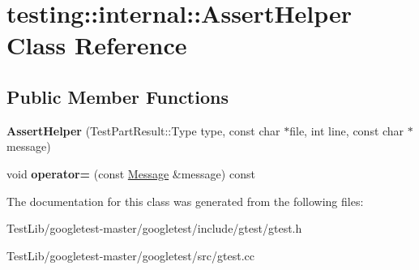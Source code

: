 \hypertarget{classtesting_1_1internal_1_1AssertHelper}{}\section{testing\+:\+:internal\+:\+:Assert\+Helper Class Reference}
\label{classtesting_1_1internal_1_1AssertHelper}
\subsection*{Public Member Functions}
\begin{DoxyCompactItemize}
\item 
\mbox{\label{classtesting_1_1internal_1_1AssertHelper_ac2c9334518fd4087189b4505567a3c90}} 
{\bfseries Assert\+Helper} (Test\+Part\+Result\+::\+Type type, const char $\ast$file, int line, const char $\ast$message)
\item 
\mbox{\label{classtesting_1_1internal_1_1AssertHelper_a97bf22d786131ab7baa86b97a27aeb4d}} 
void {\bfseries operator=} (const \hyperlink{classtesting_1_1Message}{Message} \&message) const
\end{DoxyCompactItemize}


The documentation for this class was generated from the following files\+:\begin{DoxyCompactItemize}
\item 
Test\+Lib/googletest-\/master/googletest/include/gtest/gtest.\+h\item 
Test\+Lib/googletest-\/master/googletest/src/gtest.\+cc\end{DoxyCompactItemize}
